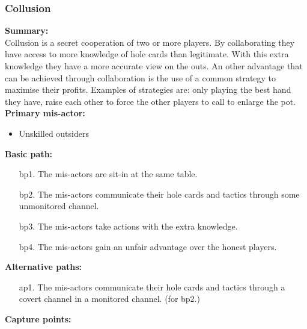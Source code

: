 \documentclass[a4paper,11pt]{report}
\begin{document}
\subsubsection{Collusion}
\textbf{Summary:} \\
Collusion is a secret cooperation of two or more players. By collaborating they have access to more knowledge of hole cards than legitimate. With this extra knowledge they have a more accurate view on the outs. An other advantage that can be achieved through collaboration is the use of a common strategy to maximise their profits. Examples of strategies are: only playing the best hand they have, raise each other to force the other players to call to enlarge the pot. \\
\textbf{Primary mis-actor:}
\begin{itemize}
\item Unskilled outsiders
\end{itemize}
\textbf{Basic path:}
\begin{enumerate}
\item[bp1.] The mis-actors are sit-in at the same table.
\item[bp2.] The mis-actors communicate their hole cards and tactics through some unmonitored channel.
\item[bp3.] The mis-actors take actions with the extra knowledge.
\item[bp4.] The mis-actors gain an unfair advantage over the honest players.
\end{enumerate}
\textbf{Alternative paths:}
\begin{itemize}
\item[ap1.] The mis-actors communicate their hole cards and tactics through a covert channel in a monitored channel. (for bp2.)
\end{itemize}
\textbf{Capture points:}
\end{document}
